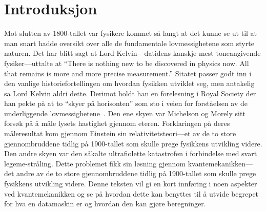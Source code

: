 \documentclass[a4paper,norsk,12pt]{book}
\begin{document}
\tableofcontents

\chapter{Introduksjon}
Mot slutten av 1800-tallet var fysikere kommet så langt at det kunne se ut til at man snart hadde oversikt over alle de fundamentale lovmessighetene som styrte naturen. Det har blitt sagt at Lord Kelvin---datidens kanskje mest toneangivende fysiker---uttalte at ``There is nothing new to be discovered in physics now. All that remains is more and more precise measurement.'' Sitatet passer godt inn i den vanlige historiefortellingen om hvordan fysikken utviklet seg, men antakelig sa Lord Kelvin aldri dette. Derimot holdt han en forelesning i Royal Society der han pekte på at to ``skyer på horisonten'' som sto i veien for forståelsen av de underliggende lovmessighetene~\cite{doi:10.1080/14786440109462664}. Den ene skyen var Michelson og Morely sitt forsøk på å måle lysets hastighet gjennom eteren. Forklaringen på deres måleresultat kom gjennom Einstein sin relativitetsteori---et av de to store gjennombruddene tidlig på 1900-tallet som skulle prege fysikkens utvikling videre. Den andre skyen var den såkalte ultrafiolette katastrofen i forbindelse med svart legeme-stråling. Dette problemet fikk sin løsning gjennom kvantemekanikken---det andre av de to store gjennombruddene tidlig på 1900-tallet som skulle prege fysikkens utvikling videre. Denne teksten vil gi en kort innføring i noen aspekter ved kvantemekanikken og se på hvordan dette kan benyttes til å utvide begrepet for hva en datamaskin er og hvordan den kan gjøre beregninger.













\end{document}
